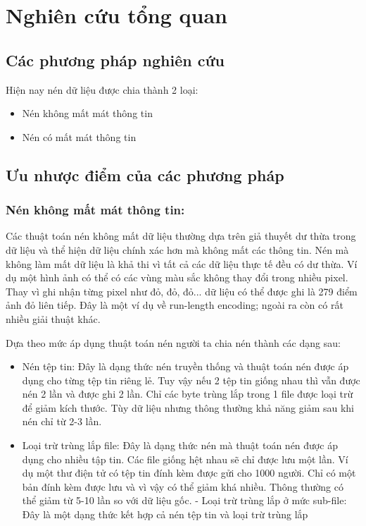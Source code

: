 \chapter{Nghiên cứu tổng quan}
\label{cha: chap1}

\section{Các phương pháp nghiên cứu}

Hiện nay nén dữ liệu được chia thành 2 loại:
\begin{itemize}[leftmargin=1.5cm]
      \item Nén không mất mát thông tin
      \item Nén có mất mát thông tin
\end{itemize}

\section{Ưu nhược điểm của các phương pháp}
\subsection{Nén không mất mát thông tin: }

Các thuật toán nén không mất dữ liệu thường dựa trên giả thuyết dư thừa trong dữ liệu
và thể hiện dữ liệu chính xác hơn mà không mất các thông tin. Nén mà không làm mất dữ
liệu là khả thi vì tất cả các dữ liệu thực tế đều có dư thừa. Ví dụ một hình ảnh có thể
có các vùng màu sắc không thay đổi trong nhiều pixel. Thay vì ghi nhận từng pixel
như đỏ, đỏ, đỏ... dữ liệu có thể được ghi là 279 điểm ảnh đỏ liên tiếp. Đây là một
ví dụ về run-length encoding; ngoài ra còn có rất nhiều giải thuật khác.

Dựa theo mức áp dụng thuật toán nén người ta chia nén thành các dạng sau:
\begin{itemize}[leftmargin=1.5cm]
      \item Nén tệp tin: Đây là dạng thức nén truyền thống và thuật toán nén được
            áp dụng cho từng tệp tin riêng lẻ. Tuy vậy nếu 2 tệp tin giống nhau thì vẫn
            được nén 2 lần và được ghi 2 lần. Chỉ các byte trùng lắp trong 1 file được loại
            trừ để giảm kích thước. Tùy dữ liệu nhưng thông thường khả năng giảm sau khi
            nén chỉ từ 2-3 lần.
      \item Loại trừ trùng lắp file: Đây là dạng thức nén mà thuật toán nén được
            áp dụng cho nhiều tập tin. Các file giống hệt nhau sẽ chỉ được lưu một lần.
            Ví dụ một thư điện tử có tệp tin đính kèm được gửi cho 1000 người. Chỉ có một
            bản đính kèm được lưu và vì vậy có thể giảm khá nhiều. Thông thường có thể giảm
            từ 5-10 lần so với dữ liệu gốc. - Loại trừ trùng lắp ở mức sub-file: Đây là một
            dạng thức kết hợp cả nén tệp tin và loại trừ trùng lắp
\end{itemize}


